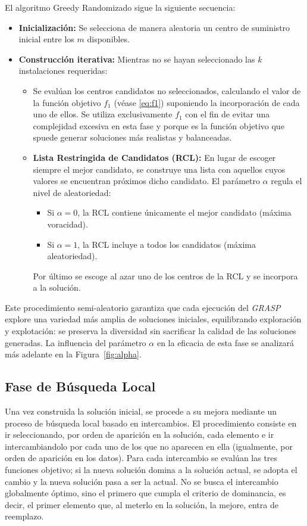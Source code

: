 \documentclass[12pt,a4paper]{book}
\begin{document}
El algoritmo Greedy Randomizado sigue la siguiente secuencia:  

\begin{itemize}
    \item \textbf{Inicialización:} Se selecciona de manera aleatoria un centro de suministro inicial entre los $m$ disponibles.
    \item \textbf{Construcción iterativa:} Mientras no se hayan seleccionado las $k$ instalaciones requeridas:
    \begin{itemize}
        \item Se evalúan los centros candidatos no seleccionados, calculando el valor de la función objetivo $f_1$ (véase \ref{eq:f1}) suponiendo la incorporación de cada uno de ellos. Se utiliza exclusivamente $f_1$ con el fin de evitar una complejidad excesiva en esta fase y porque es la función objetivo que spuede generar soluciones más realistas y balanceadas.
        \item \textbf{Lista Restringida de Candidatos (RCL):} En lugar de escoger siempre el mejor candidato, se construye una lista con aquellos cuyos valores se encuentran próximos dicho candidato. El parámetro $\alpha$ regula el nivel de aleatoriedad:
        \begin{itemize}
            \item Si $\alpha = 0$, la RCL contiene únicamente el mejor candidato (máxima voracidad).
            \item Si $\alpha = 1$, la RCL incluye a todos los candidatos (máxima aleatoriedad).
        \end{itemize}
        Por último se escoge al azar uno de los centros de la RCL y se incorpora a la solución.
    \end{itemize}
\end{itemize}

Este procedimiento semi-aleatorio garantiza que cada ejecución del \textit{GRASP} explore una variedad más amplia de soluciones iniciales, equilibrando exploración y explotación: se preserva la diversidad sin sacrificar la calidad de las soluciones generadas. La influencia del parámetro $\alpha$ en la eficacia de esta fase se analizará más adelante en la Figura~\ref{fig:alpha}.

\subsection{Fase de Búsqueda Local}
Una vez construida la solución inicial, se procede a su mejora mediante un proceso de búsqueda local basado en intercambios. El procedimiento consiste en ir seleccionando, por orden de aparición en la solución, cada elemento e ir intercambiandolo por cada uno de los que no aparecen en ella (igualmente, por orden de aparición en los datos). Para cada intercambio se evalúan las tres funciones objetivo; si la nueva solución domina a la solución actual, se adopta el cambio y la nueva solución pasa a ser la actual. No se busca el intercambio globalmente óptimo, sino el primero que cumpla el criterio de dominancia, es decir, el primer elemento que, al meterlo en la solución, la mejore, entra de reemplazo. 
\end{document}
